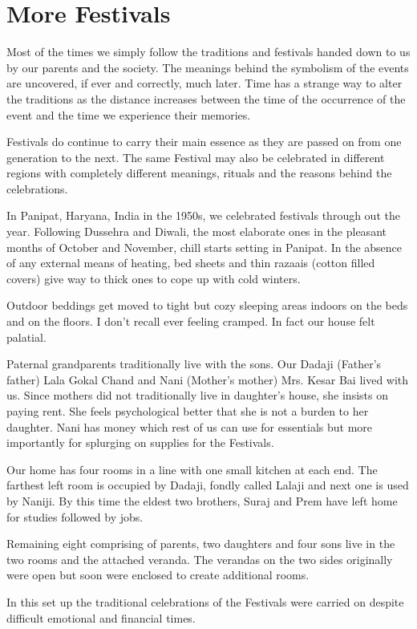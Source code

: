 \chapter{More Festivals}
Most of the times we simply follow the traditions and festivals handed
down to us by our parents and the society. The meanings behind the
symbolism of the events are uncovered, if ever and correctly, much later.
Time has a strange way to alter the traditions as the distance increases
between the time of the occurrence of the event and the time we experience
their memories. 

Festivals do continue to carry their main essence as they are passed on
from one generation to the next. The same Festival may also be celebrated
in different regions with completely different meanings, rituals and the
reasons behind the celebrations. 

In Panipat, Haryana, India in the 1950s, we celebrated festivals through
out the year. Following Dussehra and Diwali, the most elaborate ones in
the pleasant months of October and November, chill starts setting in
Panipat. In the absence of any external means of heating, bed sheets and
thin razaais (cotton filled covers) give way to thick ones to cope up with
cold winters. 

Outdoor beddings get moved to tight but cozy sleeping areas indoors on the
beds and on the floors. I don't recall ever feeling cramped. In fact our
house felt palatial. 

Paternal grandparents traditionally live with the sons. Our  Dadaji
(Father's father) Lala Gokal Chand and Nani (Mother's mother) Mrs. Kesar
Bai lived with us. Since mothers did not traditionally live in daughter's
house, she insists on paying rent. She feels psychological better that she
is not a burden to her daughter. Nani has money which rest of us can use
for essentials but more importantly for splurging on supplies for the
Festivals. 

Our home has four rooms in a line with one small kitchen at each end. The
farthest left room is occupied by Dadaji, fondly called Lalaji and next
one is used by Naniji. By this time the eldest two brothers, Suraj and
Prem have left home for studies followed by jobs. 

Remaining eight comprising of parents, two daughters and four sons live in
the two rooms and the attached veranda. The verandas on the two sides
originally were open but soon were enclosed to create additional rooms. 

In this set up the traditional celebrations of the Festivals were carried
on despite difficult emotional and financial times. 

